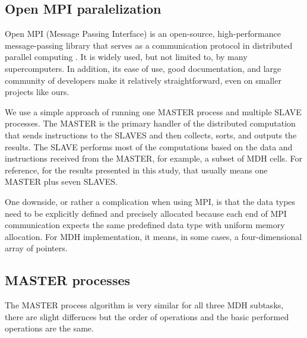 \subsection{Open MPI paralelization}
    Open MPI (Message Passing Interface) is an open-source, high-performance message-passing library that serves as a communication protocol in distributed parallel computing \citep{openmpi2022}. It is widely used, but not limited to, by many supercomputers. In addition, its ease of use, good documentation, and large community of developers make it relatively straightforward, even on smaller projects like ours. 

    We use a simple approach of running one MASTER process and multiple SLAVE processes. The MASTER is the primary handler of the distributed computation that sends instructions to the SLAVES and then collects, sorts, and outputs the results. The SLAVE performs most of the computations based on the data and instructions received from the MASTER, for example, a subset of MDH cells. For reference, for the results presented in this study, that usually means one MASTER plus seven SLAVES.

    One downside, or rather a complication when using MPI, is that the data types need to be explicitly defined and precisely allocated because each end of MPI communication expects the same predefined data type with uniform memory allocation. For MDH implementation, it means, in some cases, a four-dimensional array of pointers.

\subsection{MASTER processes}
    The MASTER process algorithm is very similar for all three MDH subtasks, there are slight differnces but the order of operations and the basic performed operations are the same.  

    \begin{figure}[H]
    \centering
    \end{figure}

